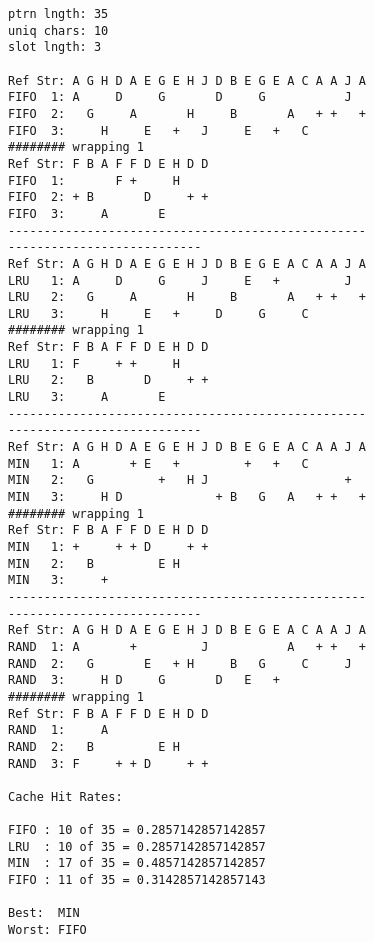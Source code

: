 \documentclass[11pt]{article}
\begin{document}
\begin{lstlisting}
ptrn lngth: 35
uniq chars: 10
slot lngth: 3

Ref Str: A G H D A E G E H J D B E G E A C A A J A
FIFO  1: A     D     G       D     G           J
FIFO  2:   G     A       H     B       A   + +   +
FIFO  3:     H     E   +   J     E   +   C
######## wrapping 1
Ref Str: F B A F F D E H D D
FIFO  1:       F +     H
FIFO  2: + B       D     + +
FIFO  3:     A       E
--------------------------------------------------
---------------------------
Ref Str: A G H D A E G E H J D B E G E A C A A J A
LRU   1: A     D     G     J     E   +         J
LRU   2:   G     A       H     B       A   + +   +
LRU   3:     H     E   +     D     G     C
######## wrapping 1
Ref Str: F B A F F D E H D D
LRU   1: F     + +     H
LRU   2:   B       D     + +
LRU   3:     A       E
--------------------------------------------------
---------------------------
Ref Str: A G H D A E G E H J D B E G E A C A A J A
MIN   1: A       + E   +         +   +   C
MIN   2:   G         +   H J                   +
MIN   3:     H D             + B   G   A   + +   +
######## wrapping 1
Ref Str: F B A F F D E H D D
MIN   1: +     + + D     + +
MIN   2:   B         E H
MIN   3:     +
--------------------------------------------------
---------------------------
Ref Str: A G H D A E G E H J D B E G E A C A A J A
RAND  1: A       +         J           A   + +   +
RAND  2:   G       E   + H     B   G     C     J
RAND  3:     H D     G       D   E   +
######## wrapping 1
Ref Str: F B A F F D E H D D
RAND  1:     A
RAND  2:   B         E H
RAND  3: F     + + D     + +

Cache Hit Rates:

FIFO : 10 of 35 = 0.2857142857142857
LRU  : 10 of 35 = 0.2857142857142857
MIN  : 17 of 35 = 0.4857142857142857
FIFO : 11 of 35 = 0.3142857142857143

Best:  MIN
Worst: FIFO
\end{lstlisting}
\end{document}
